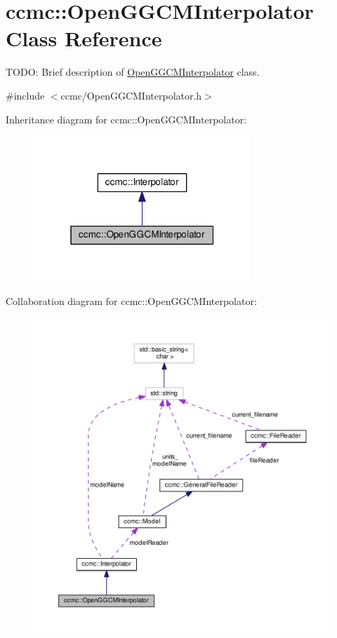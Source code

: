 \hypertarget{classccmc_1_1_open_g_g_c_m_interpolator}{\section{ccmc\-:\-:Open\-G\-G\-C\-M\-Interpolator Class Reference}
\label{classccmc_1_1_open_g_g_c_m_interpolator}
}


T\-O\-D\-O\-: Brief description of \hyperlink{classccmc_1_1_open_g_g_c_m_interpolator}{Open\-G\-G\-C\-M\-Interpolator} class.  




{\ttfamily \#include $<$ccmc/\-Open\-G\-G\-C\-M\-Interpolator.\-h$>$}



Inheritance diagram for ccmc\-:\-:Open\-G\-G\-C\-M\-Interpolator\-:
\nopagebreak
\begin{figure}[H]
\begin{center}
\leavevmode
\includegraphics[width=232pt]{classccmc_1_1_open_g_g_c_m_interpolator__inherit__graph}
\end{center}
\end{figure}


Collaboration diagram for ccmc\-:\-:Open\-G\-G\-C\-M\-Interpolator\-:
\nopagebreak
\begin{figure}[H]
\begin{center}
\leavevmode
\includegraphics[width=350pt]{classccmc_1_1_open_g_g_c_m_interpolator__coll__graph}
\end{center}
\end{figure}
